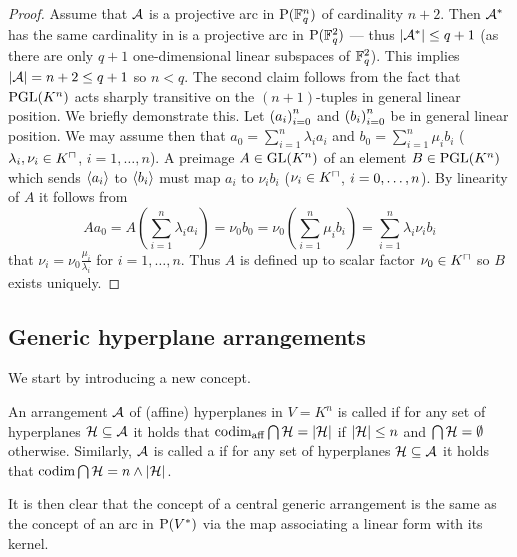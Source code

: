 \begin{proof}
    Assume that $\mathcal{A}$ is a projective arc in $\P(\field{q}^n)$ of cardinality $n+2$. Then ${\mathcal{A}}^{\ast}$ has the same cardinality in is a projective arc in $\P(\field{q}^2)$ --- thus $\left|{\mathcal{A}}^{\ast}\right|\leq q+1$ (as there are only $q+1$ one-dimensional linear subspaces of $\mathbb{F}_{q}^2$). This implies $\left|\mathcal{A}\right|=n+2\leq q+1$ so $n<q$.
    The second claim follows from the fact that $\mathrm{PGL}(K^n)$ acts sharply transitive on the $(n+1)$-tuples in general linear position.
    We briefly demonstrate this. Let $\seq{a_i}_{i=0}^n$ and $\seq{b_i}_{i=0}^n$ be in general linear position. We may assume then that $a_0=\sum_{i=1}^n{\lambda_i a_i}$ and $b_0=\sum_{i=1}^n{\mu_i b_i}$ ($\lambda_i,\nu_i\in \units K$, $i=1,\ldots,n$).
    A preimage $A\in\mathrm{GL}(K^n)$ of an element $B\in\mathrm{PGL}(K^n)$ which sends $\gen{a_i}$ to $\gen{b_i}$ must map $a_i$ to $\nu_i b_i$ ($\nu_i\in \units K$, $i=\range 0 n$). By linearity of $A$ it follows from
    $$
    Aa_0=A\left(\sum_{i=1}^n{\lambda_i a_i}\right)=\nu_0 b_0=\nu_0\left(\sum_{i=1}^n{\mu_i b_i}\right)=\sum_{i=1}^n{\lambda_i\nu_i b_i}
    $$
    that $\nu_i=\nu_0\frac{\mu_i}{\lambda_i}$ for $i=1,\ldots,n$. Thus $A$ is defined up to scalar factor $\nu_0\in \units K$ so $B$ exists uniquely.
\end{proof}
\subsection{Generic hyperplane arrangements}

We start by introducing a new concept.

\begin{definition}
    An arrangement $\mathcal{A}$ of (affine) hyperplanes in $V=K^n$ is called  if for any set of hyperplanes $\mathcal{H}\subseteq\mathcal{A}$ it holds that $\mathop\mathrm{codim}_{\mathop\mathrm{aff}}{\bigcap\mathcal{H}}=\left|\mathcal{H}\right|$ if $\left|\mathcal{H}\right|\leq n$ and $\bigcap\mathcal{H}=\emptyset$ otherwise.
    Similarly, $\mathcal{A}$ is called a  if for any set of hyperplanes $\mathcal{H}\subseteq\mathcal{A}$ it holds that $\mathop\mathrm{codim}{\bigcap\mathcal{H}}=n\wedge\left|\mathcal{H}\right|$.
\end{definition}

\begin{remark}
    It is then clear that the concept of a central generic arrangement is the same as the concept of an arc in $\mathrm{P}({V}^{\ast})$ via the map associating a linear form with its kernel.
\end{remark}

